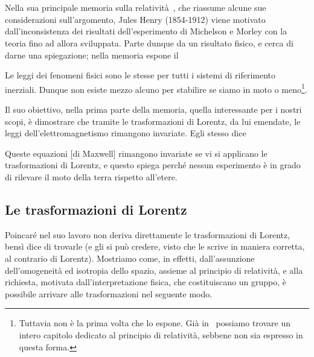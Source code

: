 \chapter{\poin}
\minitoc
Nella sua principale memoria sulla relativit\`a~\cite{carro1}, che
riassume alcune sue considerazioni sull'argomento, Jules Henry \poin {}
(1854-1912) viene motivato dall'inconsistenza dei risultati
dell'esperimento di Michelson e Morley con la teoria fino ad allora
sviluppata.
%
Parte dunque da un risultato fisico, e cerca di darne una spiegazione;
nella memoria espone il
\begin{principio}
  Le leggi dei fenomeni fisici sono le stesse per tutti i sistemi di
  riferimento inerziali.  Dunque non esiste mezzo alcuno per stabilire
  se siamo in moto o meno\footnote{Tuttavia non \`e la prima volta che
    \poin{} lo espone. Gi\`a in~\cite{carro4} possiamo trovare un
    intero capitolo dedicato al principio di relativit\`a, sebbene non
    sia espresso in questa forma.}.
\end{principio}
Il suo obiettivo, nella prima parte della memoria, quella interessante
per i nostri scopi, \`e dimostrare che tramite le trasformazioni di
Lorentz, da lui emendate, le leggi dell'elettromagnetismo rimangono
invariate. Egli stesso dice
\begin{citaz}
  Queste equazioni [di Maxwell] rimangono invariate se vi si applicano
  le trasformazioni di Lorentz, e questo spiega perch\'e nessun
  esperimento \`e in grado di rilevare il moto della terra rispetto
  all'etere.
\end{citaz}
\section{Le trasformazioni di Lorentz}
Poincar\'e nel suo lavoro non deriva direttamente le trasformazioni di
Lorentz, bens\`i dice di trovarle (e gli si pu\`o credere, visto che le
scrive in maniera corretta, al contrario di Lorentz). Mostriamo come, in
effetti, dall'assunzione dell'omogeneit\`a ed isotropia dello
spazio, assieme al principio di relativit\`a, e alla richiesta, motivata
dall'interpretazione fisica, che costituiscano un gruppo, \`e possibile arrivare
alle trasformazioni nel seguente modo.

